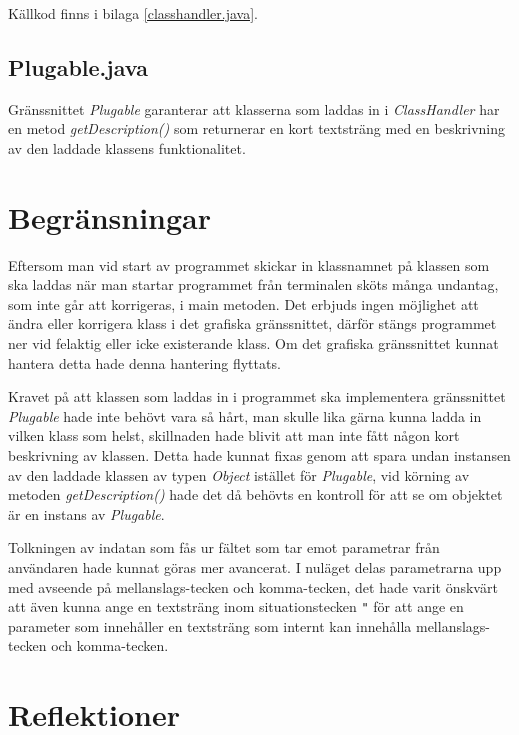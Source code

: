 \documentclass[a4paper, 12pt]{article}
\begin{document}
Källkod finns i bilaga \ref{classhandler.java}.

\subsection{Plugable.java}
Gränssnittet \textit{Plugable} garanterar att klasserna som laddas in i
\textit{ClassHandler} har en metod \textit{getDescription()} som
returnerar en kort textsträng med en beskrivning av den laddade
klassens funktionalitet.

\section{Begränsningar}

Eftersom man vid start av programmet skickar in klassnamnet på klassen
som ska laddas när man startar programmet från terminalen sköts många
undantag, som inte går att korrigeras, i main metoden. Det erbjuds
ingen möjlighet att ändra eller korrigera klass i det grafiska
gränssnittet, därför stängs programmet ner vid felaktig eller icke
existerande klass. Om det grafiska gränssnittet kunnat hantera detta
hade denna hantering flyttats.

Kravet på att klassen som laddas in i programmet ska implementera
gräns\-snittet \textit{Plugable} hade inte behövt vara så hårt, man
skulle lika gärna kunna ladda in vilken klass som helst, skillnaden
hade blivit att man inte fått någon kort beskrivning av klassen. Detta
hade kunnat fixas genom att spara undan instansen av den laddade
klassen av typen \textit{Object} istället för \textit{Plugable}, vid
körning av metoden \textit{getDescription()} hade det då behövts en
kontroll för att se om objektet är en instans av \textit{Plugable}.

Tolkningen av indatan som fås ur fältet som tar emot parametrar från
anv\-ändaren hade kunnat göras mer avancerat. I nuläget delas
parametrarna upp med avseende på mellanslags-tecken och komma-tecken,
det hade varit önskvärt att även kunna ange en textsträng inom
situationstecken \verb!"! för att ange en parameter som innehåller en
textsträng som internt kan innehålla mellanslags-tecken och
komma-tecken.


\section{Reflektioner}
\end{document}
